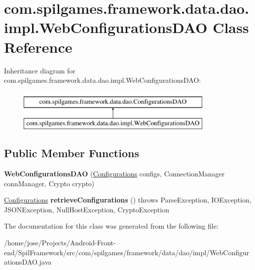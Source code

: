 \hypertarget{classcom_1_1spilgames_1_1framework_1_1data_1_1dao_1_1impl_1_1_web_configurations_d_a_o}{\section{com.\-spilgames.\-framework.\-data.\-dao.\-impl.\-Web\-Configurations\-D\-A\-O Class Reference}
\label{classcom_1_1spilgames_1_1framework_1_1data_1_1dao_1_1impl_1_1_web_configurations_d_a_o}
}
Inheritance diagram for com.\-spilgames.\-framework.\-data.\-dao.\-impl.\-Web\-Configurations\-D\-A\-O\-:\begin{figure}[H]
\begin{center}
\leavevmode
\includegraphics[height=2.000000cm]{classcom_1_1spilgames_1_1framework_1_1data_1_1dao_1_1impl_1_1_web_configurations_d_a_o}
\end{center}
\end{figure}
\subsection*{Public Member Functions}
\begin{DoxyCompactItemize}
\item 
\hypertarget{classcom_1_1spilgames_1_1framework_1_1data_1_1dao_1_1impl_1_1_web_configurations_d_a_o_af86e9962a1c22df78b8e5915c1e77bfa}{{\bfseries Web\-Configurations\-D\-A\-O} (\hyperlink{classcom_1_1spilgames_1_1framework_1_1data_1_1_configurations}{Configurations} configs, Connection\-Manager conn\-Manager, Crypto crypto)}\label{classcom_1_1spilgames_1_1framework_1_1data_1_1dao_1_1impl_1_1_web_configurations_d_a_o_af86e9962a1c22df78b8e5915c1e77bfa}

\item 
\hypertarget{classcom_1_1spilgames_1_1framework_1_1data_1_1dao_1_1impl_1_1_web_configurations_d_a_o_a917475b5ec1000c1247cebc7139230d9}{\hyperlink{classcom_1_1spilgames_1_1framework_1_1data_1_1_configurations}{Configurations} {\bfseries retrieve\-Configurations} ()  throws Parse\-Exception, I\-O\-Exception, J\-S\-O\-N\-Exception, Null\-Host\-Exception, Crypto\-Exception }\label{classcom_1_1spilgames_1_1framework_1_1data_1_1dao_1_1impl_1_1_web_configurations_d_a_o_a917475b5ec1000c1247cebc7139230d9}

\end{DoxyCompactItemize}


The documentation for this class was generated from the following file\-:\begin{DoxyCompactItemize}
\item 
/home/jose/\-Projects/\-Android-\/\-Front-\/end/\-Spil\-Framework/src/com/spilgames/framework/data/dao/impl/Web\-Configurations\-D\-A\-O.\-java\end{DoxyCompactItemize}
